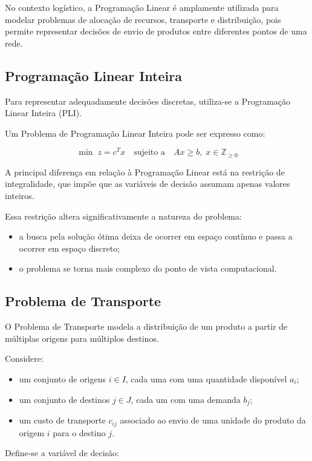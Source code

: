 No contexto logístico, a Programação Linear é amplamente utilizada para modelar problemas de alocação de recursos, transporte e distribuição, pois permite representar decisões de envio de produtos entre diferentes pontos de uma rede.

\subsection{Programação Linear Inteira}

Para representar adequadamente decisões discretas, utiliza-se a Programação Linear Inteira (PLI).

Um Problema de Programação Linear Inteira pode ser expresso como:

\[
\min \; z = c^T x \quad \text{sujeito a} \quad Ax \ge b, \; x \in \mathbb{Z}_{\geq 0}
\]

A principal diferença em relação à Programação Linear está na restrição de integralidade, que impõe que as variáveis de decisão assumam apenas valores inteiros.

Essa restrição altera significativamente a natureza do problema:
\begin{itemize}
    \item a busca pela solução ótima deixa de ocorrer em espaço contínuo e passa a ocorrer em espaço discreto;
    \item o problema se torna mais complexo do ponto de vista computacional.
\end{itemize}

\subsection{Problema de Transporte}

O Problema de Transporte modela a distribuição de um produto a partir de múltiplas origens para múltiplos destinos.

Considere:
\begin{itemize}
    \item um conjunto de origens $i \in I$, cada uma com uma quantidade disponível $a_i$;
    \item um conjunto de destinos $j \in J$, cada um com uma demanda $b_j$;
    \item um custo de transporte $c_{ij}$ associado ao envio de uma unidade do produto da origem $i$ para o destino $j$.
\end{itemize}

Define-se a variável de decisão:

